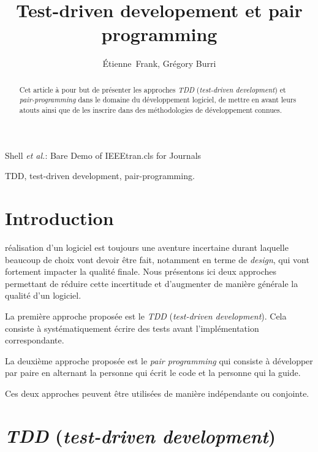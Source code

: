 \documentclass[journal, a4paper, frenchb]{IEEEtran}
\begin{document}
\title{Test-driven developement et pair programming}

\author{Étienne~Frank, Grégory Burri}

{Shell \MakeLowercase{\textit{et al.}}: Bare Demo of IEEEtran.cls for Journals}

\maketitle

\begin{abstract}
Cet article à pour but de présenter les approches \emph{TDD} (\emph{test-driven development}) et \emph{pair-programming} dans le domaine du développement logiciel, de mettre en avant leurs atouts ainsi que de les inscrire dans des méthodologies de développement connues.
\end{abstract}

\begin{IEEEkeywords}
TDD, test-driven development, pair-programming.
\end{IEEEkeywords}

\IEEEpeerreviewmaketitle

\section{Introduction}

 réalisation d'un logiciel est toujours une aventure incertaine durant laquelle beaucoup de choix vont devoir être fait, notamment en terme de \emph{design}, qui vont fortement impacter la qualité finale. Nous présentons ici deux approches permettant de réduire cette incertitude et d'augmenter de manière générale la qualité d'un logiciel.

La première approche proposée est le \emph{TDD} (\emph{test-driven development}). Cela consiste à systématiquement écrire des tests avant l'implémentation correspondante.

La deuxième approche proposée est le \emph{pair programming} qui consiste à développer par paire en alternant la personne qui écrit le code et la personne qui la guide.

Ces deux approches peuvent être utilisées de manière indépendante ou conjointe.


\section{\emph{TDD} (\emph{test-driven development})}
\end{document}
